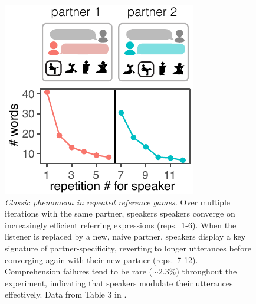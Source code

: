 \begin{figure}[t!]
\centering
\includegraphics[scale=1.3]{./figures/clark92_compressed}
\vspace{1em}
\caption{\textit{Classic phenomena in repeated reference games.} Over multiple iterations with the same partner, speakers speakers converge on increasingly efficient referring expressions (reps.~1-6). When the listener is replaced by a new, naive partner, speakers display a key signature of partner-specificity, reverting to longer utterances before converging again with their new partner (reps.~7-12). Comprehension failures tend to be rare ($\sim 2.3\%$) throughout the experiment, indicating that speakers modulate their utterances effectively. Data from Table 3 in \protect{}.}
\label{fig:clark92}
\end{figure}

